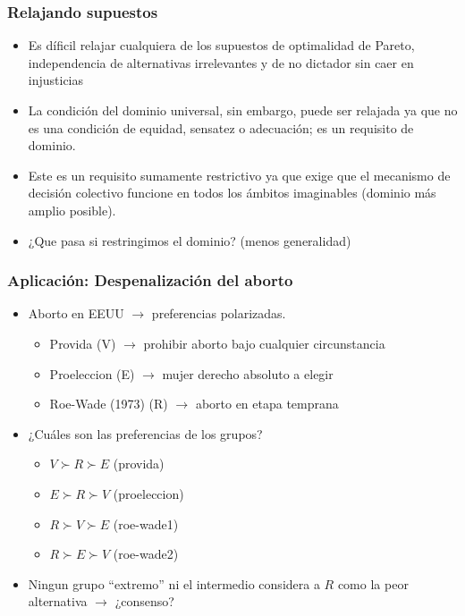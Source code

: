 \documentclass[14pt,aspectratio=169]{beamer}
\begin{document}
\begin{frame}\frametitle{Relajando supuestos}
\begin{itemize}
\item Es díficil relajar cualquiera de los supuestos de optimalidad de
  Pareto, independencia de alternativas irrelevantes y de no dictador
  sin caer en injusticias
\item La condición del dominio universal, sin embargo, puede ser
  relajada ya que no es una condición de equidad, sensatez o
  adecuación; es un requisito de dominio.
\item Este es un requisito sumamente restrictivo ya que exige que el
  mecanismo de decisión colectivo funcione en todos los ámbitos
  imaginables (dominio más amplio posible).
\item ¿Que pasa si restringimos el dominio? (menos generalidad)
\end{itemize}
\end{frame}

\begin{frame}\frametitle{Aplicación: Despenalización del aborto}
\begin{itemize} \itemsep 10pt
\item Aborto en EEUU $\longrightarrow$ preferencias polarizadas.
\begin{itemize} \itemsep 5pt \medskip
\item Provida (V) $\longrightarrow$ prohibir aborto bajo cualquier
  circunstancia
\item Proeleccion (E) $\longrightarrow$ mujer derecho absoluto a
  elegir
\item Roe-Wade (1973) (R) $\longrightarrow$
  aborto en etapa temprana
\end{itemize}
\item ¿Cuáles son las preferencias de los grupos?
\begin{itemize}
\item $V \succ R \succ E$ (provida)
\item $E \succ R \succ V$ (proeleccion)
\item $R \succ V \succ E$ (roe-wade1)
\item $R \succ E \succ V$ (roe-wade2)
\end{itemize}
\item Ningun grupo ``extremo'' ni el intermedio considera a $R$ como la peor alternativa
  $\longrightarrow$ ¿consenso?
\end{itemize}
\end{frame}
\end{document}
